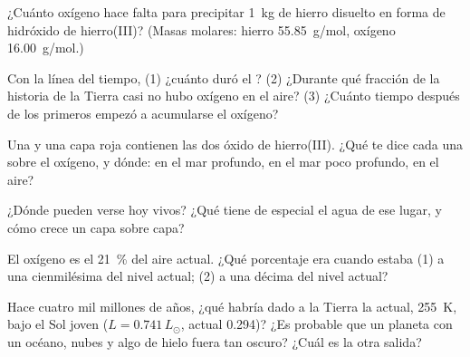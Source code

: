 \begin{exercise}[$\star\star$]\label{exo:g12:early-earth:7}
¿Cuánto oxígeno hace falta para precipitar \qty{1}{kg} de hierro disuelto en
forma de hidróxido de hierro(III)? (Masas molares: hierro
\qty{55.85}{g/mol}, oxígeno \qty{16.00}{g/mol}.)
\end{exercise}

\begin{exercise}[$\star\star$]\label{exo:g12:early-earth:8}
Con la línea del tiempo, (1) ¿cuánto duró el ? (2)
¿Durante qué fracción de la historia de la Tierra casi no hubo oxígeno en el
aire? (3) ¿Cuánto tiempo después de los primeros  empezó a
acumularse el oxígeno?
\end{exercise}

\begin{exercise}[$\star\star$]\label{exo:g12:early-earth:9}
Una  y una capa roja contienen las dos óxido de
hierro(III). ¿Qué te dice cada una sobre el oxígeno, y dónde: en el mar
profundo, en el mar poco profundo, en el aire?
\end{exercise}

\begin{exercise}[$\star\star$]\label{exo:g12:early-earth:10}
¿Dónde pueden verse hoy  vivos? ¿Qué tiene de especial el agua
de ese lugar, y cómo crece un  capa sobre capa?
\end{exercise}

\begin{exercise}[$\star\star$]\label{exo:g12:early-earth:11}
El oxígeno es el \qty{21}{\percent} del aire actual. ¿Qué porcentaje era
cuando estaba (1) a una cienmilésima del nivel actual; (2) a una décima del
nivel actual?
\end{exercise}

\begin{exercise}[$\star\star\star$]\label{exo:g12:early-earth:12}
Hace cuatro mil millones de años, ¿qué  habría dado a la Tierra la
 actual, \qty{255}{K}, bajo el Sol joven ($L = 0.741\,L_\odot$,
 actual 0.294)? ¿Es probable que un planeta con un océano, nubes y algo
de hielo fuera tan oscuro? ¿Cuál es la otra salida?
\end{exercise}

